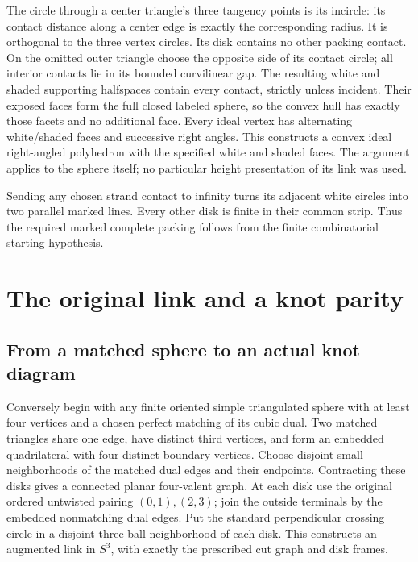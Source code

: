The circle through a center triangle's three tangency points is its
incircle: its contact distance along a center edge is exactly the
corresponding radius. It is orthogonal to the three vertex circles.
Its disk contains no other packing contact. On the omitted outer
triangle choose the opposite side of its contact circle; all interior
contacts lie in its bounded curvilinear gap. The resulting white and
shaded supporting halfspaces contain every contact, strictly unless
incident. Their exposed faces form the full closed labeled sphere,
so the convex hull has exactly those facets and no additional face.
Every ideal vertex has alternating white/shaded faces and successive
right angles. This constructs a convex ideal right-angled polyhedron with the
specified white and shaded faces. The argument applies to the sphere
itself; no particular height presentation of its link was used.

Sending any chosen strand contact to infinity turns its adjacent white
circles into two parallel marked lines. Every other disk is finite in
their common strip. Thus the required marked complete packing follows
from the finite combinatorial starting hypothesis.

\section{The original link and a knot parity}\label{bl:the-original-link-and-a-knot-parity}

\subsection{From a matched sphere to an actual knot diagram}\label{bl:from-a-matched-sphere-to-an-actual-knot-diagram}

Conversely begin with any finite oriented simple triangulated sphere
with at least four vertices and a chosen perfect matching of its cubic
dual. Two matched triangles share one edge, have distinct third vertices,
and form an embedded quadrilateral with four distinct boundary vertices.
Choose disjoint small neighborhoods of the matched dual edges and their
endpoints. Contracting these disks gives a connected planar four-valent
graph. At each disk use the original ordered untwisted pairing
\((0,1),(2,3)\); join the outside terminals by the embedded nonmatching
dual edges. Put the standard perpendicular crossing circle in a disjoint
three-ball neighborhood of each disk. This constructs an augmented
link in \(S^3\), with exactly the prescribed cut graph and disk frames.

